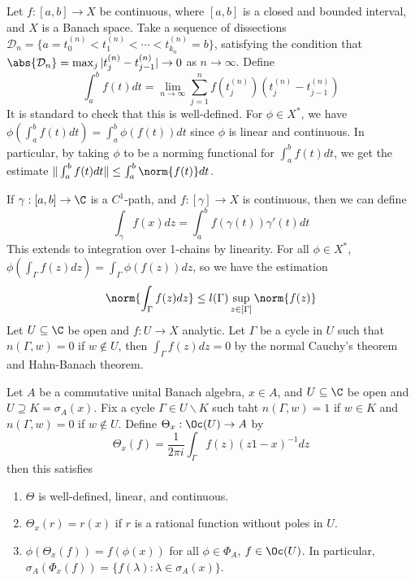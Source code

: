 \documentclass[a4paper]{article}
\begin{document}
Let $f:[a,b]\to X$ be continuous, where $[a,b]$ is a closed and bounded interval, and $X$ is a Banach space. Take a sequence of dissections $\mathcal{D}_n=\{a=t_0^{(n)}<t_1^{(n)}<\cdots<t_{k_n}^{(n)}=b\}$, satisfying the condition that $\abs{\mathcal{D}_n}=\max_j|t_j^{(n)}-t_{j-1}^{(n)}|\to 0$ as $n\to\infty$. Define
\[
  \int_a^b f(t)dt=\lim_{n\to\infty}\sum_{j=1}^n f(t_j^{(n)})(t_j^{(n)}-t_{j-1}^{(n)})
\]
It is standard to check that this is well-defined. For $\phi\in X^*$, we have $\phi(\int_a^b f(t)dt)=\int_a^b\phi(f(t))dt$ since $\phi$ is linear and continuous. In particular, by taking $\phi$ to be a norming functional for $\int_a^b f(t)dt$, we get the estimate $\|\int_a^b f(t)dt\|\leq\int_a^b\norm{f(t)}dt$.

If $\gamma:[a,b]\to\C$ is a $C^1$-path, and $f:[\gamma]\to X$ is continuous, then we can define
\[
  \int_\gamma f(x)dz=\int_a^b f(\gamma(t))\gamma'(t)dt
\]
This extends to integration over 1-chains by linearity. For all $\phi\in X^*$, $\phi(\int_\Gamma f(z)dz)=\int_\Gamma \phi(f(z))dz$, so we have the estimation
\[
  \norm{\int_\Gamma f(z)dz}\leq l(\Gamma)\sup_{z\in[\Gamma]}\norm{f(z)}
\]
Let $U\subseteq\C$ be open and $f:U\to X$ analytic. Let $\Gamma$ be a cycle in $U$ such that $n(\Gamma,w)=0$ if $w\notin U$, then $\int_\Gamma f(z)dz=0$ by the normal Cauchy's theorem and Hahn-Banach theorem.

\begin{nlemma}\label{lem:HFCLemma}
	Let $A$ be a commutative unital Banach algebra, $x\in A$, and $U\subseteq\C$ be open and $U\supseteq K=\sigma_A(x)$. Fix a cycle $\Gamma\in U\backslash K$ such taht $n(\Gamma,w)=1$ if $w\in K$ and $n(\Gamma,w)=0$ if $w\notin U$. Define $\Theta_x:\Oc(U)\to A$ by
	\[\Theta_x(f)=\frac{1}{2\pi i}\int_\Gamma f(z)(z1-x)^{-1}dz\]
	then this satisfies
	\begin{enumerate}[label=(\roman*)]
		\item $\Theta$ is well-defined, linear, and continuous.
		\item $\Theta_x(r)=r(x)$ if $r$ is a rational function without poles in $U$.
		\item $\phi(\Theta_x(f))=f(\phi(x))$ for all $\phi\in\Phi_A$, $f\in\Oc(U)$. In particular, $\sigma_A(\Phi_x(f))=\{f(\lambda):\lambda\in\sigma_A(x)\}$.
	\end{enumerate}
\end{nlemma}
\end{document}
